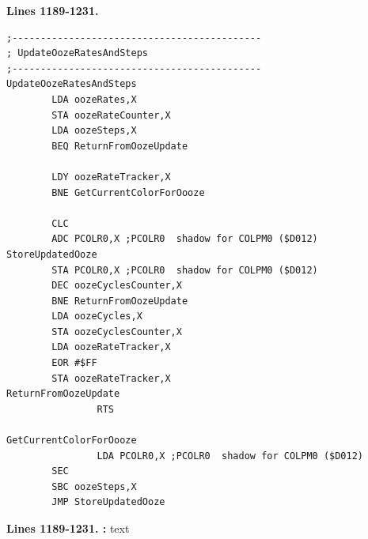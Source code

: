 \clearpage
\textbf{Lines 1189-1231. } 
\begin{lstlisting}
;--------------------------------------------
; UpdateOozeRatesAndSteps
;--------------------------------------------
UpdateOozeRatesAndSteps
        LDA oozeRates,X
        STA oozeRateCounter,X
        LDA oozeSteps,X
        BEQ ReturnFromOozeUpdate

        LDY oozeRateTracker,X
        BNE GetCurrentColorForOooze

        CLC 
        ADC PCOLR0,X ;PCOLR0  shadow for COLPM0 ($D012)
StoreUpdatedOoze
        STA PCOLR0,X ;PCOLR0  shadow for COLPM0 ($D012)
        DEC oozeCyclesCounter,X
        BNE ReturnFromOozeUpdate
        LDA oozeCycles,X
        STA oozeCyclesCounter,X
        LDA oozeRateTracker,X
        EOR #$FF
        STA oozeRateTracker,X
ReturnFromOozeUpdate   
				RTS 

GetCurrentColorForOooze   
				LDA PCOLR0,X ;PCOLR0  shadow for COLPM0 ($D012)
        SEC 
        SBC oozeSteps,X
        JMP StoreUpdatedOoze
\end{lstlisting}
\clearpage

\textbf{Lines 1189-1231. :} 
text

\clearpage
\captionsetup[figure]{font=tiny}
%

